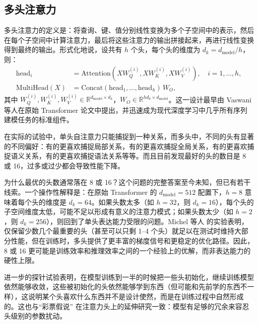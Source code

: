 \subsection{多头注意力}

多头注意力的定义是：将查询、键、值分别线性变换为多个子空间中的表示，然后在每个子空间中计算注意力，最后将这些注意力的输出拼接起来，再进行线性变换得到最终的输出。形式化地说，设共有 $h$ 个头，每个头的维度为 $d_k = d_{\text{model}} / h$，则：
\begin{align}
    \text{head}_i &= \text{Attention}(X W_Q^{(i)}, X W_K^{(i)}, X W_V^{(i)}), \quad i = 1, \dots, h, \\
    \text{MultiHead}(X) &= \text{Concat}(\text{head}_1, \dots, \text{head}_h) \, W_O,
\end{align}
其中 $W_Q^{(i)}, W_K^{(i)}, W_V^{(i)} \in \mathbb{R}^{d_{\text{model}} \times d_k}$，$W_O \in \mathbb{R}^{h d_k \times d_{\text{model}}}$。这一设计最早由 Vaswani 等人在原始 Transformer 论文中提出\cite{vaswani2023attentionneed}，并迅速成为现代深度学习中几乎所有序列建模任务的标准组件。

在实际的试验中，单头自注意力只能捕捉到一种关系，而多头中，不同的头有显著的不同偏好：有的更喜欢捕捉局部关系，有的更喜欢捕捉全局关系，有的更喜欢捕捉语义关系，有的更喜欢捕捉语法关系等等。而且目前发现最好的头的数目是 8 或 16，过多或过少都会导致性能下降。

为什么最优的头数通常落在 8 或 16？这个问题的完整答案至今未知，但已有若干线索。一个操作性解释是：在原始 Transformer 的 $d_{\text{model}} = 512$ 配置下，$h = 8$ 意味着每个头的维度是 $d_k = 64$。如果头数太多（如 $h = 32$，则 $d_k = 16$），每个头的子空间维度太低，可能不足以形成有意义的注意力模式；如果头数太少（如 $h = 2$，则 $d_k = 256$），则回到了单头表达能力受限的问题。Michel 等人\cite{michel2019sixteenheadsreallybetter} 的实验表明，仅保留少数几个最重要的头（甚至可以只剩 1--4 个头）就足以在测试时维持大部分性能，但在训练时，多头提供了更丰富的梯度信号和更稳定的优化路径。因此，8 或 16 更可能是训练效率和推理效率之间的一个经验上的优解，而非表达能力的硬性上限。

进一步的探针试验表明，在模型训练到一半的时候把一些头初始化，继续训练模型依然能够收敛，这些被初始化的头依然能够学到东西（但可能和先前学的东西不一样），这说明某个头喜欢什么东西并不是设计使然，而是在训练过程中自然形成的\cite{voita2019analyzingmultiheadselfattentionspecialized,michel2019sixteenheadsreallybetter}。这也与“彩票假说”\cite{frankle2019lotterytickethypothesisfinding} 在注意力头上的延伸研究一致：模型有足够的冗余来容忍头级别的参数扰动。

